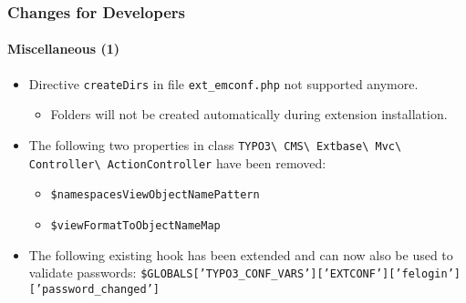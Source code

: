 \begin{frame}[fragile]
	\frametitle{Changes for Developers}
	\framesubtitle{Miscellaneous (1)}

	\begin{itemize}
		\item Directive \texttt{createDirs} in file \texttt{ext\_emconf.php} not supported anymore.

			\begin{itemize}\smaller
				\item[\ding{228}] Folders will not be created automatically during extension installation.
			\end{itemize}\normalsize

		\item The following two properties in class
			\texttt{TYPO3\textbackslash
				CMS\textbackslash
				Extbase\textbackslash
				Mvc\textbackslash
				Controller\textbackslash
				ActionController}\newline
			have been removed:

			\begin{itemize}
				\item \texttt{\$namespacesViewObjectNamePattern}
				\item \texttt{\$viewFormatToObjectNameMap}
			\end{itemize}

		\item The following existing hook has been extended and can now
			also be used to validate passwords:\newline
			{\fontsize{8}{10} \selectfont \texttt{\$GLOBALS['TYPO3\_CONF\_VARS']['EXTCONF']['felogin']['password\_changed']}}

	\end{itemize}

\end{frame}


